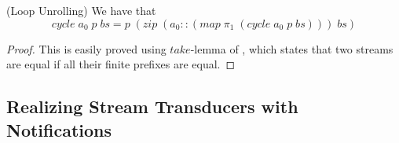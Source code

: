\documentclass[natbib]{sigplanconf}
\begin{document}
\begin{lemma}{(Loop Unrolling)} We have that 
  \begin{displaymath}
    cycle\;a_0\;p\;bs = p\;(zip\;(a_0 :: (map\;\pi_1\;(cycle\;a_0\;p\;bs)))\;bs)
  \end{displaymath}
\end{lemma}

\begin{proof}
  This is easily proved using $take$-lemma of \citet{bird-wadler}, which
  states that two streams are equal if all their finite prefixes are
  equal.
\end{proof}


\subsection{Realizing Stream Transducers with Notifications}
\end{document}
